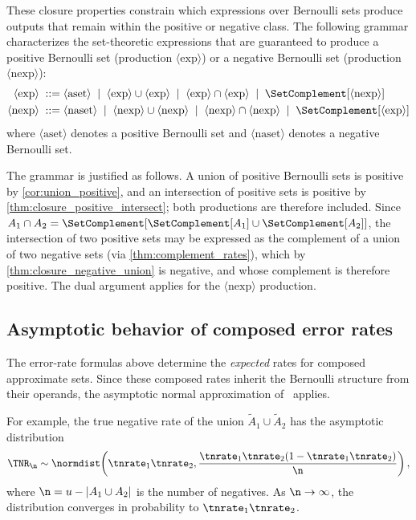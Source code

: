 These closure properties constrain which expressions over Bernoulli sets
produce outputs that remain within the positive or negative class.
The following grammar characterizes the set-theoretic expressions that are
guaranteed to produce a positive Bernoulli set (production $\langle
\mathrm{exp} \rangle$) or a negative Bernoulli set (production $\langle
\mathrm{nexp} \rangle$):
\begin{align}
\label{eq:grammar_exp}
\langle \mathrm{exp} \rangle \; ::= \; &
    \langle \mathrm{aset} \rangle
    \;\mid\; \langle \mathrm{exp} \rangle \cup \langle \mathrm{exp} \rangle
    \;\mid\; \langle \mathrm{exp} \rangle \cap \langle \mathrm{exp} \rangle
    \;\mid\; \SetComplement[\langle \mathrm{nexp} \rangle] \\
\label{eq:grammar_nexp}
\langle \mathrm{nexp} \rangle \; ::= \; &
    \langle \mathrm{naset} \rangle
    \;\mid\; \langle \mathrm{nexp} \rangle \cup \langle \mathrm{nexp}
        \rangle
    \;\mid\; \langle \mathrm{nexp} \rangle \cap \langle \mathrm{nexp}
        \rangle
    \;\mid\; \SetComplement[\langle \mathrm{exp} \rangle]
\end{align}
where $\langle \mathrm{aset} \rangle$ denotes a positive Bernoulli set and
$\langle \mathrm{naset} \rangle$ denotes a negative Bernoulli set.

The grammar is justified as follows.
A union of positive Bernoulli sets is positive by
\cref{cor:union_positive}, and an intersection of positive sets is positive
by \cref{thm:closure_positive_intersect}; both productions are therefore included.
Since $A_1 \cap A_2 = \SetComplement[\SetComplement[A_1] \cup
\SetComplement[A_2]]$, the intersection of two positive sets may be
expressed as the complement of a union of two negative sets (via
\cref{thm:complement_rates}), which by
\cref{thm:closure_negative_union} is negative, and whose complement is
therefore positive.
The dual argument applies for the $\langle \mathrm{nexp} \rangle$
production.

\subsection{Asymptotic behavior of composed error rates}

The error-rate formulas above determine the \emph{expected} rates for composed approximate sets.
Since these composed rates inherit the Bernoulli structure from their operands, the asymptotic normal approximation of~\cite{bernoulliSets} applies.

For example, the true negative rate of the union $\tilde{A}_1 \cup \tilde{A}_2$ has the asymptotic distribution
\begin{equation}
\TNR_\n \sim \normdist\!\left(\tnrate_1 \tnrate_2, \frac{\tnrate_1 \tnrate_2 (1-\tnrate_1 \tnrate_2)}{\n}\right),
\end{equation}
where $\n = u - |A_1 \cup A_2|$ is the number of negatives.
As $\n \to \infty$, the distribution converges in probability to $\tnrate_1 \tnrate_2$.

